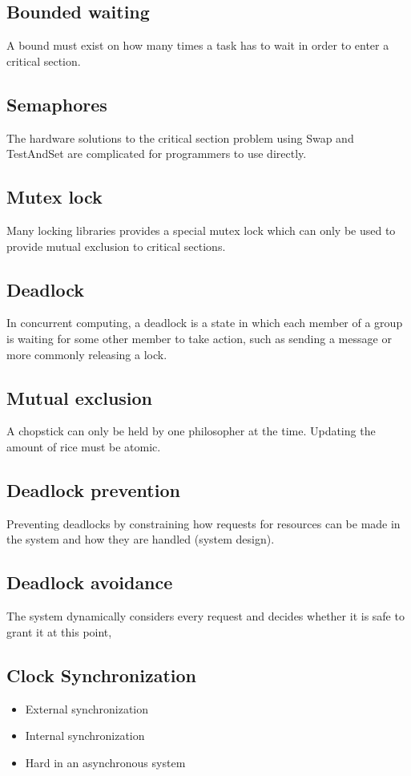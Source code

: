 \begin{multicols}{2}
\subsection{Bounded waiting}
A bound must exist on how many
times a task has to wait in order to
enter a critical section.

\subsection{Semaphores}
The hardware solutions to the critical section
problem using Swap and TestAndSet are
complicated for programmers to use directly.


\subsection{Mutex lock}
Many locking libraries provides a special
mutex lock which can only be used to
provide mutual exclusion to critical sections.

\subsection{Deadlock}
In concurrent computing, a deadlock is
a state in which each member of a
group is waiting for some other member
to take action, such as sending a
message or more commonly releasing a lock.

\subsection{Mutual exclusion}
A chopstick can only be held by one
philosopher at the time.
Updating the amount of rice must be atomic.

\subsection{Deadlock prevention}
Preventing deadlocks by constraining how requests for
resources can be made in the system and how they are
handled (system design).

\subsection{Deadlock avoidance}
The system dynamically considers every request and
decides whether it is safe to grant it at this point,

\subsection{Clock Synchronization}
\begin{itemize}
\item External synchronization
\item Internal synchronization
\item Hard in an asynchronous system
\end{itemize}


\end{multicols}
